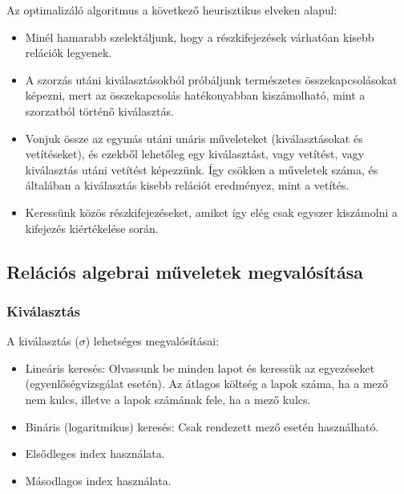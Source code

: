 \documentclass[margin=0px]{article}
\begin{document}
	\noindent Az optimalizáló algoritmus a következő heurisztikus elveken alapul:
	\begin{itemize}
		\item	Minél hamarabb szelektáljunk, hogy a részkifejezések várhatóan kisebb relációk legyenek. 
		\item	A szorzás utáni kiválasztásokból próbáljunk természetes összekapcsolásokat képezni, mert az összekapcsolás hatékonyabban kiszámolható, mint a szorzatból történő kiválasztás.
		\item	Vonjuk össze az egymás utáni unáris műveleteket (kiválasztásokat és vetítéseket), és ezekből lehetőleg egy kiválasztást, vagy vetítést, vagy kiválasztás utáni vetítést képezzünk. Így csökken a műveletek száma, és általában a kiválasztás kisebb relációt eredményez, mint a vetítés.
		\item	Keressünk közös részkifejezéseket, amiket így elég csak egyszer kiszámolni a kifejezés kiértékelése során.
	\end{itemize}
	
	\subsection{Relációs algebrai műveletek megvalósítása}
	
	\subsubsection{Kiválasztás}
	
	A kiválasztás ($\sigma$) lehetséges megvalósításai:
	\begin{itemize}
		\item	Lineáris keresés: Olvassunk be minden lapot és keressük az egyezéseket (egyenlőségvizsgálat esetén).
		Az átlagos költség a lapok száma, ha a mező nem kulcs, illetve a lapok számának fele, ha a mező kulcs.
		\item	Bináris (logaritmikus) keresés: Csak rendezett mező esetén használható.
		\item	Elsődleges index használata.
		\item	Másodlagos index használata.
	\end{itemize}
	
\end{document}
